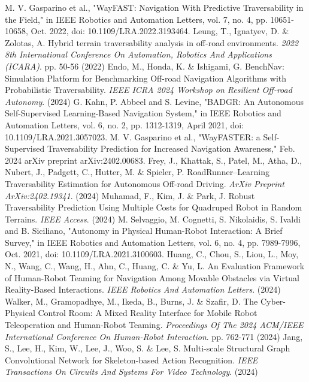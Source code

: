 \documentclass[letterpaper, 10 pt, conference]{ieeeconf}  %
\begin{document}
\begin{thebibliography}{99}

 M. V. Gasparino et al., "WayFAST: Navigation With Predictive Traversability in the Field," in IEEE Robotics and Automation Letters, vol. 7, no. 4, pp. 10651-10658, Oct. 2022, doi: 10.1109/LRA.2022.3193464.
Leung, T., Ignatyev, D. \& Zolotas, A. Hybrid terrain traversability analysis in off-road environments. {\em 2022 8th International Conference On Automation, Robotics And Applications (ICARA)}. pp. 50-56 (2022)
Endo, M., Honda, K. \& Ishigami, G. BenchNav: Simulation Platform for Benchmarking Off-road Navigation Algorithms with Probabilistic Traversability. {\em IEEE ICRA 2024 Workshop on Resilient Off-road Autonomy}. (2024)
 G. Kahn, P. Abbeel and S. Levine, "BADGR: An Autonomous Self-Supervised Learning-Based Navigation System," in IEEE Robotics and Automation Letters, vol. 6, no. 2, pp. 1312-1319, April 2021, doi: 10.1109/LRA.2021.3057023.
 M. V. Gasparino et al., "WayFASTER: a Self-Supervised Traversability Prediction for Increased Navigation Awareness," Feb. 2024 arXiv preprint arXiv:2402.00683.
Frey, J., Khattak, S., Patel, M., Atha, D., Nubert, J., Padgett, C., Hutter, M. \& Spieler, P. RoadRunner–Learning Traversability Estimation for Autonomous Off-road Driving. {\em ArXiv Preprint ArXiv:2402.19341}. (2024)
Muhamad, F., Kim, J. \& Park, J. Robust Traversability Prediction Using Multiple Costs for Quadruped Robot in Random Terrains. {\em IEEE Access}. (2024)
 M. Selvaggio, M. Cognetti, S. Nikolaidis, S. Ivaldi and B. Siciliano, "Autonomy in Physical Human-Robot Interaction: A Brief Survey," in IEEE Robotics and Automation Letters, vol. 6, no. 4, pp. 7989-7996, Oct. 2021, doi: 10.1109/LRA.2021.3100603.
Huang, C., Chou, S., Liou, L., Moy, N., Wang, C., Wang, H., Ahn, C., Huang, C. \& Yu, L. An Evaluation Framework of Human-Robot Teaming for Navigation Among Movable Obstacles via Virtual Reality-Based Interactions. {\em IEEE Robotics And Automation Letters}. (2024)
Walker, M., Gramopadhye, M., Ikeda, B., Burns, J. \& Szafir, D. The Cyber-Physical Control Room: A Mixed Reality Interface for Mobile Robot Teleoperation and Human-Robot Teaming. {\em Proceedings Of The 2024 ACM/IEEE International Conference On Human-Robot Interaction}. pp. 762-771 (2024)
Jang, S., Lee, H., Kim, W., Lee, J., Woo, S. \& Lee, S. Multi-scale Structural Graph Convolutional Network for Skeleton-based Action Recognition. {\em IEEE Transactions On Circuits And Systems For Video Technology}. (2024)

\end{thebibliography}
\end{document}
